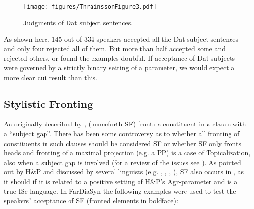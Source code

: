 \documentclass[output=paper]{LSP/langsci}
\begin{document}
\begin{figure}
\texttt{[image: figures/ThrainssonFigure3.pdf]}
\caption{Judgments of Dat subject sentences\label{fig:Thrainsson:1}.}
\end{figure}

As shown here, 145 out of 334 speakers accepted all the Dat subject sentences and only four rejected all of them. But more than half accepted some and rejected others, or found the examples doubful. If acceptance of Dat subjects were governed by a strictly binary setting of a parameter, we would expect a more clear cut result than this.

\subsection{Stylistic Fronting}

As originally described by \citet{Maling1980},  (henceforth SF) fronts a constituent in a clause with a “subject gap”. There has been some controversy as to whether all fronting of constituents in such clauses should be considered SF or whether SF only fronts heads and fronting of a maximal projection (e.g. a PP) is a case of Topicalization, also when a subject gap is involved (for a review of the issues see \citealt[368--374]{Thráinsson2007}). As pointed out by H{\&}P and discussed by several linguists (e.g. \citealt{Barnes1992}, \citealt{Vikner1995}, \citealt{Thráinsson2012}, \citealt{Angantýsson2011}), SF also occurs in , as it should if it is related to a positive setting of H{\&}Pʼs Agr-parameter and  is a true ISc language. In FarDiaSyn the following examples were used to test the speakersʼ acceptance of SF (fronted elements in boldface):
\end{document}
